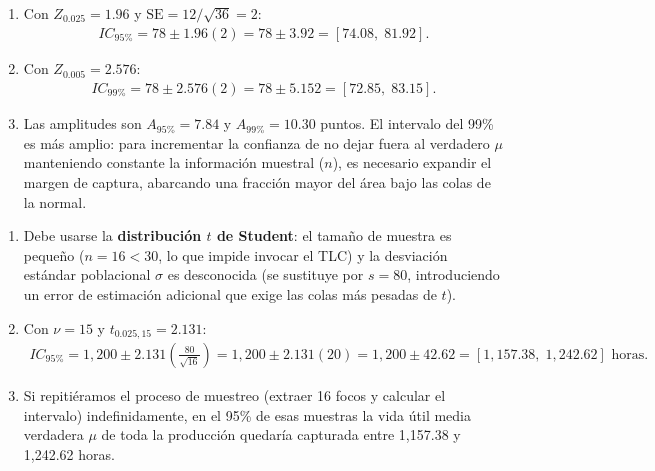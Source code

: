 \begin{solproblema}[prob:39c2251]
	\begin{enumerate}
		\item Con $Z_{0.025}=1.96$ y $\text{SE}=12/\sqrt{36}=2$:
		\begin{align}
			IC_{95\%} = 78 \pm 1.96(2) = 78 \pm 3.92 = [74.08,\;81.92].
		\end{align}
		\item Con $Z_{0.005}=2.576$:
		\begin{align}
			IC_{99\%} = 78 \pm 2.576(2) = 78 \pm 5.152 = [72.85,\;83.15].
		\end{align}
		\item Las amplitudes son $A_{95\%}=7.84$ y $A_{99\%}=10.30$ puntos. El intervalo del 99\% es más amplio: para incrementar la confianza de no dejar fuera al verdadero $\mu$ manteniendo constante la información muestral ($n$), es necesario expandir el margen de captura, abarcando una fracción mayor del área bajo las colas de la normal.
	\end{enumerate}
\end{solproblema}

\begin{solproblema}[prob:8fd99c8]
	\begin{enumerate}
		\item Debe usarse la \textbf{distribución $t$ de Student}: el tamaño de muestra es pequeño ($n=16<30$, lo que impide invocar el TLC) y la desviación estándar poblacional $\sigma$ es desconocida (se sustituye por $s=80$, introduciendo un error de estimación adicional que exige las colas más pesadas de $t$).
		\item Con $\nu=15$ y $t_{0.025,15}=2.131$:
		\begin{align}
			IC_{95\%} = 1{,}200 \pm 2.131\left(\frac{80}{\sqrt{16}}\right) = 1{,}200 \pm 2.131(20) = 1{,}200 \pm 42.62 = [1{,}157.38,\;1{,}242.62] \text{ horas.}
		\end{align}
		\item Si repitiéramos el proceso de muestreo (extraer 16 focos y calcular el intervalo) indefinidamente, en el 95\% de esas muestras la vida útil media verdadera $\mu$ de toda la producción quedaría capturada entre 1,157.38 y 1,242.62 horas.
	\end{enumerate}
\end{solproblema}

